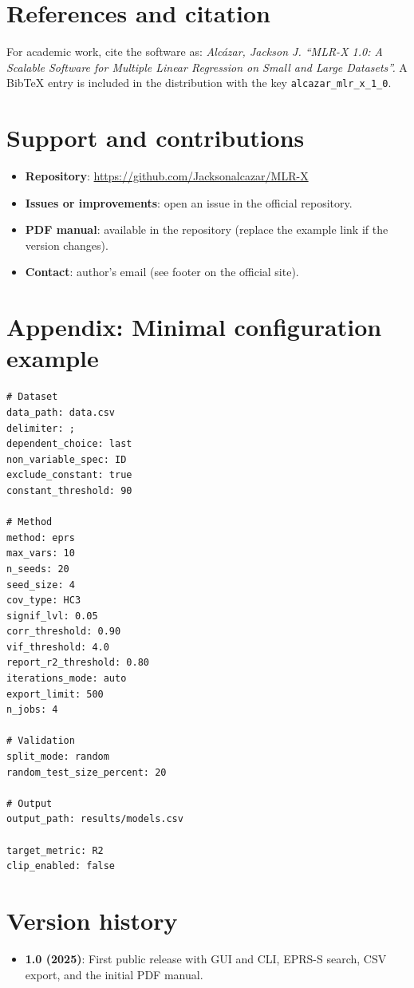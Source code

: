 \documentclass[11pt,a4paper]{article}
\begin{document}
\section{References and citation}
For academic work, cite the software as:\newline
\textit{Alcázar, Jackson J. ``MLR-X 1.0: A Scalable Software for Multiple Linear Regression on Small and Large Datasets''.} A BibTeX entry is included in the distribution with the key \texttt{alcazar\_mlr\_x\_1\_0}.\cite{mlrx-source-citation}

\section{Support and contributions}
\begin{itemize}
  \item \textbf{Repository}: \url{https://github.com/Jacksonalcazar/MLR-X}
  \item \textbf{Issues or improvements}: open an issue in the official repository.
  \item \textbf{PDF manual}: available in the repository (replace the example link if the version changes).
  \item \textbf{Contact}: author's email (see footer on the official site).
\end{itemize}

\section{Appendix: Minimal configuration example}
\begin{verbatim}
# Dataset
data_path: data.csv
delimiter: ;
dependent_choice: last
non_variable_spec: ID
exclude_constant: true
constant_threshold: 90

# Method
method: eprs
max_vars: 10
n_seeds: 20
seed_size: 4
cov_type: HC3
signif_lvl: 0.05
corr_threshold: 0.90
vif_threshold: 4.0
report_r2_threshold: 0.80
iterations_mode: auto
export_limit: 500
n_jobs: 4

# Validation
split_mode: random
random_test_size_percent: 20

# Output
output_path: results/models.csv

target_metric: R2
clip_enabled: false
\end{verbatim}

\section{Version history}
\begin{itemize}
  \item \textbf{1.0 (2025)}: First public release with GUI and CLI, EPRS-S search, CSV export, and the initial PDF manual.
\end{itemize}
\end{document}
